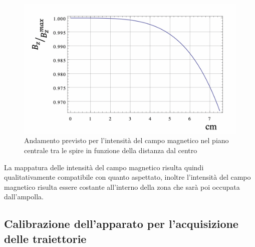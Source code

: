 \documentclass[10pt, a4paper, italian]{article}
\begin{document}
\begin{figure}
\includegraphics[width=\textwidth]{riferimentoB}
\caption{Andamento previsto per l'intensità del campo magnetico nel piano centrale tra le spire in funzione della distanza dal centro}
\end{figure}
La mappatura delle intensità del campo magnetico risulta quindi qualitativamente compatibile con quanto aspettato, inoltre l'intensità del campo magnetico risulta essere costante all'interno della zona che sarà poi occupata dall'ampolla.
\subsection{Calibrazione dell'apparato per l'acquisizione delle traiettorie}
\end{document}

